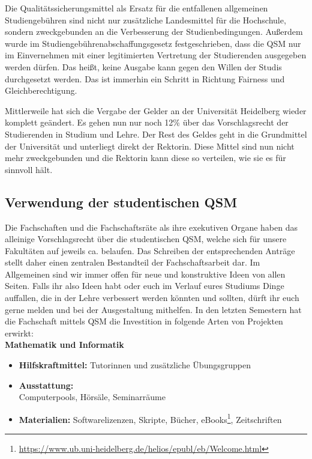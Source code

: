 
Die Qualitätssicherungsmittel als Ersatz für die entfallenen allgemeinen Studiengebühren sind nicht nur zusätzliche Landesmittel für die Hochschule, sondern zweckgebunden an die Verbesserung der Studienbedingungen. Außerdem wurde im Studien\-gebühren\-abschaffungs\-gesetz festgeschrieben, dass die QSM nur im Einvernehmen mit einer legitimierten Vertretung der Studierenden ausgegeben werden dürfen. Das heißt, keine Ausgabe kann gegen den Willen der Studis durchgesetzt werden. Das ist immerhin ein Schritt in Richtung Fairness und Gleichberechtigung.

Mittlerweile hat sich die Vergabe der Gelder an der Universität Heidelberg wieder komplett geändert. Es gehen nun nur noch 12\% über das Vorschlagsrecht der Studierenden in Studium und Lehre. Der Rest des Geldes geht in die Grundmittel der Universität und unterliegt direkt der Rektorin. Diese Mittel sind nun nicht mehr zweckgebunden und die Rektorin kann diese so verteilen, wie sie es für sinnvoll hält.


\subsection{Verwendung der studentischen QSM}
Die Fachschaften und die Fachschaftsräte als ihre exekutiven Organe haben das alleinige Vorschlagsrecht über die studentischen QSM, welche sich für unsere Fakultäten auf jeweils ca.  belaufen. Das Schreiben der entsprechenden Anträge stellt daher einen zentralen Bestandteil der Fachschaftsarbeit dar. Im Allgemeinen sind wir immer offen für neue und konstruktive Ideen von allen Seiten. Falls ihr also Ideen habt oder euch im Verlauf eures Studiums Dinge auffallen, die in der Lehre verbessert werden könnten und sollten, dürft ihr euch gerne melden und bei der Ausgestaltung mithelfen. In den letzten Semestern hat die Fachschaft mittels QSM die Investition in folgende Arten von Projekten erwirkt:\\

\noindent\textbf{Mathematik und Informatik}
\begin{itemize}
	\item \textbf{Hilfskraftmittel:} Tutorinnen und zusätzliche Übungsgruppen
	\item \textbf{Ausstattung:}\\ Computerpools, Hörsäle, Seminarräume
	\item \textbf{Materialien:} Softwarelizenzen, Skripte, Bücher, eBooks\footnote{\url{https://www.ub.uni-heidelberg.de/helios/epubl/eb/Welcome.html}}, Zeitschriften
\end{itemize}

